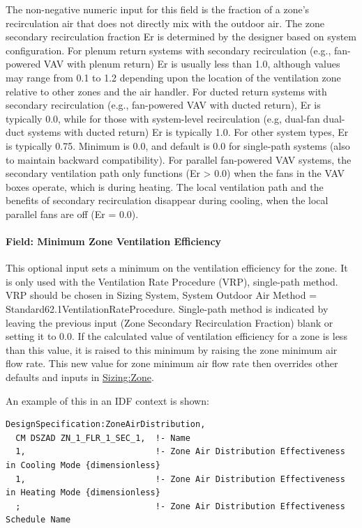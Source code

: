 The non-negative numeric input for this field is the fraction of a zone's recirculation air that does not directly mix with the outdoor air. The zone secondary recirculation fraction Er is determined by the designer based on system configuration. For plenum return systems with secondary recirculation (e.g., fan-powered VAV with plenum return) Er is usually less than 1.0, although values may range from 0.1 to 1.2 depending upon the location of the ventilation zone relative to other zones and the air handler. For ducted return systems with secondary recirculation (e.g., fan-powered VAV with ducted return), Er is typically 0.0, while for those with system-level recirculation (e.g, dual-fan dual-duct systems with ducted return) Er is typically 1.0. For other system types, Er is typically 0.75. Minimum is 0.0, and default is 0.0 for single-path systems (also to maintain backward compatibility). For parallel fan-powered VAV systems, the secondary ventilation path only functions (Er \textgreater{} 0.0) when the fans in the VAV boxes operate, which is during heating. The local ventilation path and the benefits of secondary recirculation disappear during cooling, when the local parallel fans are off (Er = 0.0).

\paragraph{Field: Minimum Zone Ventilation
Efficiency}\label{field-minimum-zone-ventilation-efficiency}

This optional input sets a minimum on the ventilation efficiency for the zone. It is only used with the Ventilation Rate Procedure (VRP), single-path method. VRP should be chosen in Sizing System, System Outdoor Air Method = Standard62.1VentilationRateProcedure. Single-path method is indicated by leaving the previous input (Zone Secondary Recirculation Fraction) blank or setting it to 0.0. If the calculated value of ventilation efficiency for a zone is less than this value, it is raised to this minimum by raising the zone minimum air flow rate. This new value for zone minimum air flow rate then overrides other defaults and inputs in \hyperref[sizingzone]{Sizing:Zone}.

An example of this in an IDF context is shown:

\begin{lstlisting}
DesignSpecification:ZoneAirDistribution,
  CM DSZAD ZN_1_FLR_1_SEC_1,  !- Name
  1,                          !- Zone Air Distribution Effectiveness in Cooling Mode {dimensionless}
  1,                          !- Zone Air Distribution Effectiveness in Heating Mode {dimensionless}
  ;                           !- Zone Air Distribution Effectiveness Schedule Name
\end{lstlisting}

